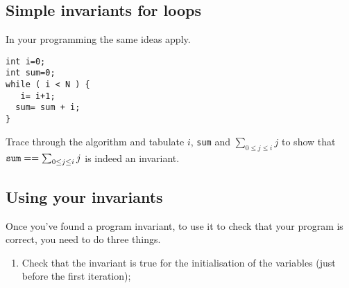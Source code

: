 \documentclass[twoside=false,DIV=14]{scrartcl}
\begin{document}
\begin{itemize}
%
%
%
%

\subsection*{Simple invariants for loops}

In your programming the same ideas apply.

\begin{verbatim}
int i=0;  
int sum=0;
while ( i < N ) {
   i= i+1;
  sum= sum + i;
}
\end{verbatim}

Trace through the algorithm and tabulate $i$, {\tt sum} and $\sum_{0\leq j \leq i} j$ to  show that ${\tt sum} == \sum_{0\leq j \leq i} j$ is indeed an invariant. 


\subsection*{Using your invariants}

Once you've found a program invariant, to use it to
check that your program is correct, you need to do three things.

\begin{enumerate}
\item Check that the invariant is true for the initialisation of the variables (just before the first iteration);


\end{enumerate}
\end{itemize}
\end{document}
